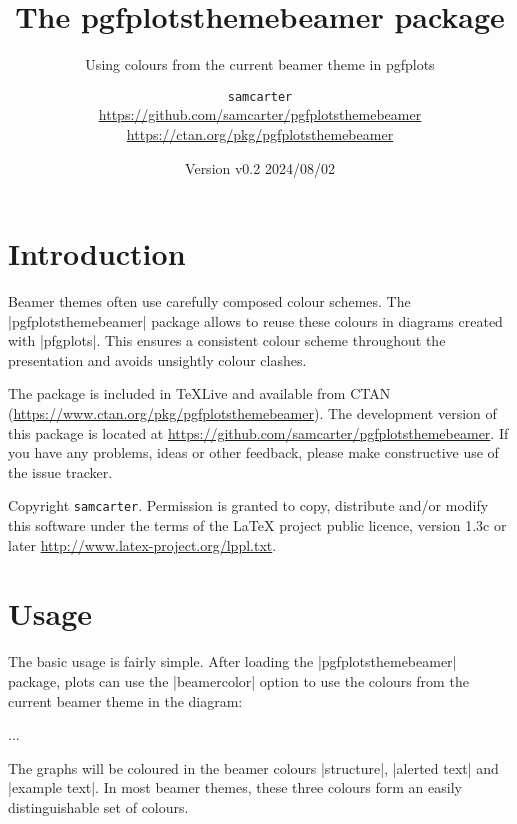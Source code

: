 \documentclass{scrartcl}
\title{The pgfplotsthemebeamer package}
\subtitle{Using colours from the current beamer theme in pgfplots}
\author{%
  \texorpdfstring{
    \texttt{samcarter}\\
    \url{https://github.com/samcarter/pgfplotsthemebeamer}\\
    \url{https://ctan.org/pkg/pgfplotsthemebeamer}
  }{samcarter}}
\date{Version v0.2 \textendash{} 2024/08/02}
\begin{document}
\maketitle

\section{Introduction}
\label{intro}

Beamer themes often use carefully composed colour schemes. The \saminline|pgfplotsthemebeamer| package allows to reuse these colours in diagrams created with \saminline|pfgplots|. This ensures a consistent colour scheme throughout the presentation and avoids unsightly colour clashes.

The package is included in \TeX{}Live 
and available from \textsc{CTAN} (\url{https://www.ctan.org/pkg/pgfplotsthemebeamer}).
The development version of this package is located at \url{https://github.com/samcarter/pgfplotsthemebeamer}. If you have any problems, ideas or other feedback, please make constructive use of the issue tracker.

Copyright  \texttt{samcarter}. Permission is granted to copy, distribute and\slash or modify this software under the terms of the LaTeX project public licence, version 1.3c or later \url{http://www.latex-project.org/lppl.txt}.

\section{Usage}

The basic usage is fairly simple. After loading the \saminline|pgfplotsthemebeamer| package, plots can use the \saminline|beamercolor| option to use the colours from the current beamer theme in the diagram:
\begin{tcolorbox}[title={Usage}]
\begin{samcode}
\usepackage{pgfplotsthemebeamer}

\begin{axis}[
  beamercolors
]
...
\end{axis}
\end{samcode}
\end{tcolorbox}
The graphs will be coloured in the beamer colours \saminline|structure|, \saminline|alerted text| and \saminline|example text|. In most beamer themes, these three colours form an easily distinguishable set of colours.
\end{document}
